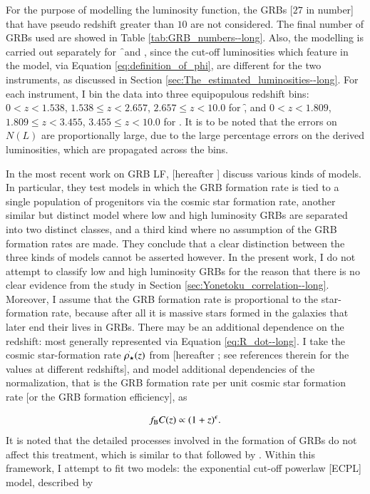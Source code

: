For the purpose of modelling the luminosity function, the GRBs [$27$ in number] that have pseudo redshift greater than $10$ are not considered. The final number of GRBs used are showed in Table \ref{tab:GRB_numbers--long}. Also, the modelling is carried out separately for \f\ and \s, since the cut-off luminosities which feature in the model, via Equation \ref{eq:definition_of_phi}, are different for the two instruments, as discussed in Section \ref{sec:The_estimated_luminosities--long}. For each instrument, I bin the data into three equipopulous redshift bins: $0 < z <1.538$, $1.538 \leq z < 2.657$, $2.657 \leq z < 10.0$ for \f, and $0 < z < 1.809$, $1.809 \leq z <3.455$, $3.455 \leq z < 10.0$ for \s. It is to be noted that the errors on $N(L)$ are proportionally large, due to the large percentage errors on the derived luminosities, which are propagated across the bins.

In the most recent work on GRB LF, \cite{Amaral-Rogers_et_al.-2017-MNRAS} [hereafter ] discuss various kinds of models. In particular, they test models in which the GRB formation rate is tied to a single population of progenitors via the cosmic star formation rate, another similar but distinct model where low and high luminosity GRBs are separated into two distinct classes, and a third kind where no assumption of the GRB formation rates are made. They conclude that a clear distinction between the three kinds of models cannot be asserted however. In the present work, I do not attempt to classify low and high luminosity GRBs for the reason that there is no clear evidence from the study in Section \ref{sec:Yonetoku_correlation--long}. Moreover, I assume that the GRB formation rate is proportional to the star-formation rate, because after all it is massive stars formed in the galaxies that later end their lives in GRBs. There may be an additional dependence on the redshift: most generally represented via Equation \ref{eq:R_dot--long}. I take the cosmic star-formation rate $\overset{.}{\rho_{\star}} (z)$ from \cite{Bouwens_et_al.-2015-ApJ} [hereafter ; see references therein for the values at different redshifts], and model additional dependencies of the normalization, that is the GRB formation rate per unit cosmic star formation rate [or the GRB formation efficiency], as 

\begin{equation}
f_{\rm{B}} C(z) \propto (1+z)^{\epsilon}.
\label{eq:fB.C_of_z--long}
\end{equation} It is noted that the detailed processes involved in the formation of GRBs do not affect this treatment, which is similar to that followed by . Within this framework, I attempt to fit two models: the exponential cut-off powerlaw [ECPL] model, described by

